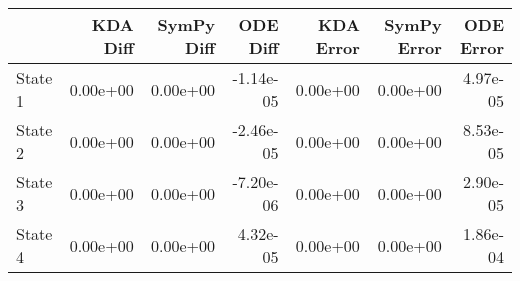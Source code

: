 \begin{tabular}{lrrrrrr}
\toprule
{} &  KDA Diff &  SymPy Diff &  ODE Diff &  KDA Error &  SymPy Error &  ODE Error \\
\midrule
State 1 &  0.00e+00 &    0.00e+00 & -1.14e-05 &   0.00e+00 &     0.00e+00 &   4.97e-05 \\
State 2 &  0.00e+00 &    0.00e+00 & -2.46e-05 &   0.00e+00 &     0.00e+00 &   8.53e-05 \\
State 3 &  0.00e+00 &    0.00e+00 & -7.20e-06 &   0.00e+00 &     0.00e+00 &   2.90e-05 \\
State 4 &  0.00e+00 &    0.00e+00 &  4.32e-05 &   0.00e+00 &     0.00e+00 &   1.86e-04 \\
\bottomrule
\end{tabular}
